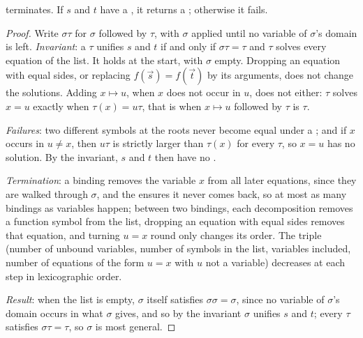 \begin{theorem}[Robinson]\label{thm:b2:predicate-logic:mgu}
 terminates. If $s$ and $t$ have a , it returns a ;
otherwise it fails.
\end{theorem}

\begin{proof}
Write $\sigma\tau$ for $\sigma$ followed by $\tau$, with $\sigma$ applied until no variable of $\sigma$'s domain is left.
\emph{Invariant}: a  $\tau$ unifies $s$ and $t$ if and only if $\sigma\tau = \tau$ and $\tau$ solves every
equation of the list. It holds at the start, with $\sigma$ empty.
Dropping an equation with equal sides, or replacing $f(\vec s) = f(\vec t)$ by its arguments, does not change the
solutions. Adding $x \mapsto u$, when $x$ does not occur in $u$, does not either: $\tau$ solves $x = u$ exactly when
$\tau(x) = u\tau$, that is when $x \mapsto u$ followed by $\tau$ is $\tau$.

\emph{Failures}: two different symbols at the roots never become equal under a ; and if $x$ occurs in $u
\neq x$, then $u\tau$ is strictly larger than $\tau(x)$ for every $\tau$, so $x = u$ has no solution. By the invariant,
$s$ and $t$ then have no .

\emph{Termination}: a binding removes the variable $x$ from all later equations, since they are walked through $\sigma$,
and the  ensures it never comes back, so at most as many bindings as variables happen; between two bindings,
each decomposition removes a function symbol from the list, dropping an equation with equal sides removes that
equation, and turning $u = x$ round only changes its order. The triple (number of unbound variables, number of
symbols in the list, variables included, number of equations of the form $u = x$ with $u$ not a variable) decreases at
each step in lexicographic order.

\emph{Result}: when the list is empty, $\sigma$ itself satisfies $\sigma\sigma = \sigma$, since no variable of $\sigma$'s domain
occurs in what $\sigma$ gives, and so by the invariant $\sigma$ unifies $s$ and $t$; every  $\tau$ satisfies
$\sigma\tau = \tau$, so $\sigma$ is most general.
\end{proof}

